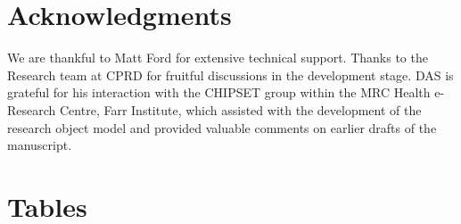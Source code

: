 \documentclass[10pt]{article}
\begin{document}
\section*{Acknowledgments}
We are thankful to Matt Ford for extensive technical support. Thanks to the Research team at CPRD for fruitful discussions in the development stage. DAS is grateful for his interaction with the CHIPSET group within the MRC Health e-Research Centre, Farr Institute, which assisted with the development of the research object model and provided valuable comments on earlier drafts of the manuscript. 







\section*{Tables}
\end{document}
